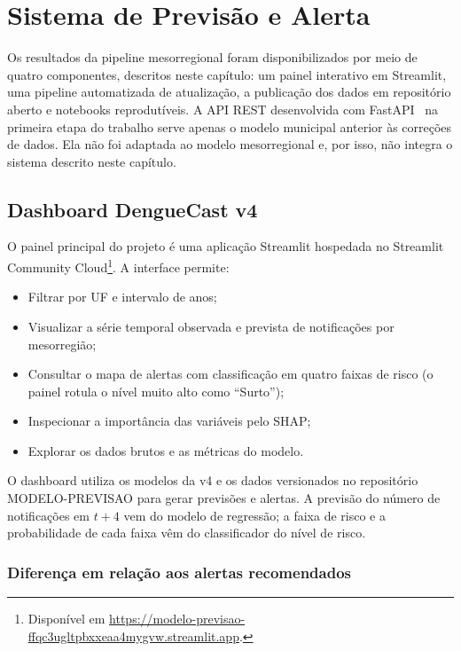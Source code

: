 \chapter{Sistema de Previsão e Alerta}
\label{cap:sistema}

Os resultados da pipeline mesorregional foram disponibilizados por meio de quatro componentes, descritos neste capítulo: um painel interativo em Streamlit, uma pipeline automatizada de atualização, a publicação dos dados em repositório aberto e notebooks reprodutíveis. A API REST desenvolvida com FastAPI~\cite{fastapi2024} na primeira etapa do trabalho serve apenas o modelo municipal anterior às correções de dados. Ela não foi adaptada ao modelo mesorregional e, por isso, não integra o sistema descrito neste capítulo.

\section{Dashboard DengueCast v4}

O painel principal do projeto é uma aplicação Streamlit \cite{streamlit2024} hospedada no Streamlit Community Cloud\footnote{Disponível em \url{https://modelo-previsao-ffqc3ugltpbxxeaa4mygvw.streamlit.app}.}. A interface permite:

\begin{itemize}
    \item Filtrar por UF e intervalo de anos;
    \item Visualizar a série temporal observada e prevista de notificações por mesorregião;
    \item Consultar o mapa de alertas com classificação em quatro faixas de risco (o painel rotula o nível muito alto como ``Surto'');
    \item Inspecionar a importância das variáveis pelo SHAP;
    \item Explorar os dados brutos e as métricas do modelo.
\end{itemize}

O dashboard utiliza os modelos da v4 e os dados versionados no repositório MODELO-PREVISAO \cite{modeloprevisao2026} para gerar previsões e alertas. A previsão do número de notificações em $t+4$ vem do modelo de regressão; a faixa de risco e a probabilidade de cada faixa vêm do classificador do nível de risco.

\subsection{Diferença em relação aos alertas recomendados}

